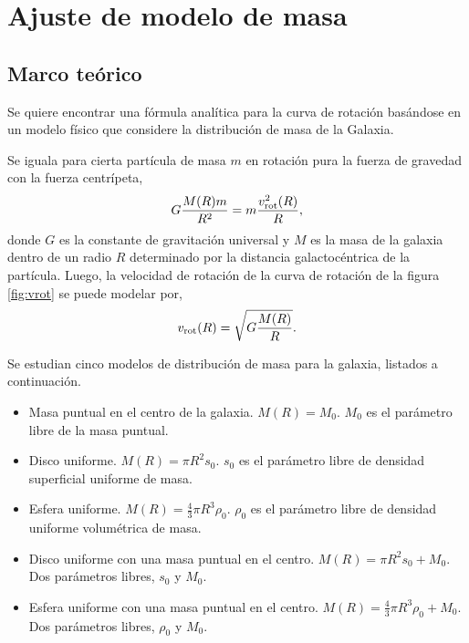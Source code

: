 \section{Ajuste de modelo de masa}\label{sec:massmodel}

\subsection{Marco teórico}

Se quiere encontrar una fórmula analítica para la curva de rotación basándose en un modelo físico que considere la distribución de masa de la Galaxia.

Se iguala para cierta partícula de masa $m$ en rotación pura la fuerza de gravedad con la fuerza centrípeta,
\begin{equation}
G\frac{M(R)m}{R^2}=m\frac{v_\textnormal{rot}^2(R)}{R}
,\end{equation}
donde $G$ es la constante de gravitación universal y $M$ es la masa de la galaxia dentro de un radio $R$ determinado por la distancia galactocéntrica de la partícula. Luego, la velocidad de rotación de la curva de rotación de la figura \ref{fig:vrot} se puede modelar por,
\begin{equation}
v_\textnormal{rot}(R)=\sqrt{G\frac{M(R)}{R}}
.\label{eq:vmass}\end{equation}

Se estudian cinco modelos de distribución de masa para la galaxia, listados a continuación.
\begin{itemize}
\item Masa puntual en el centro de la galaxia. $M(R)=M_0$. $M_0$ es el parámetro libre de la masa puntual.

\item Disco uniforme. $M(R)=\pi R^2s_0$. $s_0$ es el parámetro libre de densidad superficial uniforme de masa.

\item Esfera uniforme. $M(R)=\frac{4}{3}\pi R^3\rho_0$. $\rho_0$ es el parámetro libre de densidad uniforme volumétrica de masa.

\item Disco uniforme con una masa puntual en el centro. $M(R)=\pi R^2s_0+M_0$. Dos parámetros libres, $s_0$ y $M_0$.

\item Esfera uniforme con una masa puntual en el centro. $M(R)=\frac{4}{3}\pi R^3\rho_0+M_0$. Dos parámetros libres, $\rho_0$ y $M_0$.
\end{itemize}

